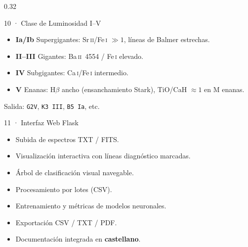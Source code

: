 \documentclass[final]{beamer}
\begin{document}
\begin{frame}[t]{}
\begin{columns}[t,totalwidth=\paperwidth]
\begin{column}{0.32\paperwidth}
  \vspace{0.5cm}

  \begin{block}{10 · Clase de Luminosidad I--V}
    \begin{itemize}\setlength\itemsep{5pt}
      \item \textbf{Ia/Ib} Supergigantes:
            Sr\,\textsc{ii}/Fe\,\textsc{i} $\gg 1$,
            líneas de Balmer estrechas.
      \item \textbf{II--III} Gigantes:
            Ba\,\textsc{ii}~4554 / Fe\,\textsc{i} elevado.
      \item \textbf{IV} Subgigantes:
            Ca\,\textsc{i}/Fe\,\textsc{i} intermedio.
      \item \textbf{V} Enanas:
            H$\beta$ ancho (ensanchamiento Stark),
            TiO/CaH $\approx 1$ en M enanas.
    \end{itemize}
    \vspace{0.3cm}
    Salida: \texttt{G2V}, \texttt{K3\,III}, \texttt{B5\,Ia}, etc.
  \end{block}

  \vspace{0.5cm}

  \begin{block}{11 · Interfaz Web Flask}
    \begin{itemize}\setlength\itemsep{5pt}
      \item Subida de espectros TXT / FITS.
      \item Visualización interactiva con líneas diagnóstico marcadas.
      \item Árbol de clasificación visual navegable.
      \item Procesamiento por lotes (CSV).
      \item Entrenamiento y métricas de modelos neuronales.
      \item Exportación CSV / TXT / PDF.
      \item Documentación integrada en \textbf{castellano}.
    \end{itemize}
  \end{block}

  \vspace{0.5cm}


\end{column}
\end{columns}
\end{frame}
\end{document}
